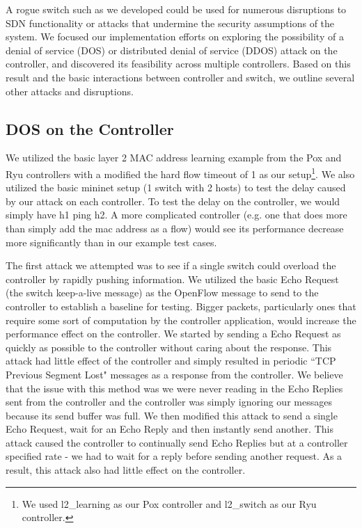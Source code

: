 A rogue switch such as we developed could be used for numerous disruptions to SDN functionality or attacks that undermine the security assumptions of the system.  We focused our implementation efforts on exploring the possibility of a denial of service (DOS) or distributed denial of service (DDOS) attack on the controller, and discovered its feasibility across multiple controllers.  Based on this result and the basic interactions between controller and switch, we outline several other attacks and disruptions. 

\subsection{DOS on the Controller}
We utilized the basic layer 2 MAC address learning example from the Pox and Ryu controllers with a modified the hard flow timeout of 1 as our setup\footnote{We used l2\_learning as our Pox controller and l2\_switch as our Ryu controller.}. We also utilized the basic mininet setup (1 switch with 2 hosts) to test the delay caused by our attack on each controller. To test the delay on the controller, we would simply have h1 ping h2. A more complicated controller (e.g. one that does more than simply add the mac address as a flow) would see its performance decrease more significantly than in our example test cases.

 The first attack we attempted was to see if a single switch could overload the controller by rapidly pushing information. We utilized the basic Echo Request (the switch keep-a-live message) as the OpenFlow message to send to the controller to establish a baseline for testing. Bigger packets, particularly ones that require some sort of computation by the controller application, would increase the performance effect on the controller. We started by sending a Echo Request as quickly as possible to the controller without caring about the response. This attack had little effect of the controller and simply resulted in periodic ``TCP Previous Segment Lost" messages as a response from the controller. We believe that the issue with this method was we were never reading in the Echo Replies sent from the controller and the controller was simply ignoring our messages because its send buffer was full. We then modified this attack to send a single Echo Request, wait for an Echo Reply and then instantly send another. This attack caused the controller to continually send Echo Replies but at a controller specified rate - we had to wait for a reply before sending another request. As a result, this attack also had little effect on the controller.


